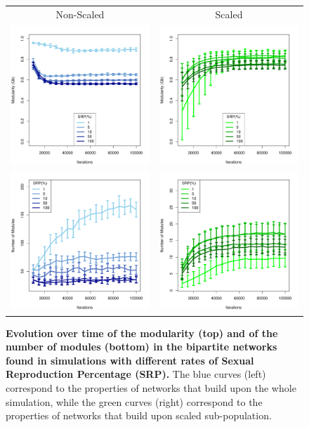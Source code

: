 \documentclass[fleqn,10pt]{wlscirep}
\begin{document}
\begin{figure}[ht!]
\centering
\begin{tabular}{cc}
   Non-Scaled &  Scaled \\
\includegraphics[width=.4\linewidth]{img/QbMetOverTimeFULL.pdf} &
\includegraphics[width=.4\linewidth]{img/QbMetOverTimeRESC.pdf} \\
\includegraphics[width=.4\linewidth]{img/NumModuleOverTimeFULL.pdf}	&
\includegraphics[width=.4\linewidth]{img/NumModuleOverTimeRESC.pdf}\\
\end{tabular}
\caption{\textbf{Evolution over time of the modularity (top) and of the number of modules (bottom) in the bipartite networks found in simulations with different rates of Sexual Reproduction Percentage (SRP).} The blue curves (left) correspond to the properties of networks that build upon the whole simulation, while the green curves (right) correspond to the properties of networks that build upon scaled sub-population.}
\label{fig:dynamic}
\end{figure}
\end{document}
